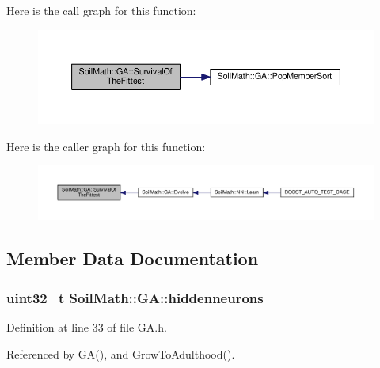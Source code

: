 Here is the call graph for this function\+:\nopagebreak
\begin{figure}[H]
\begin{center}
\leavevmode
\includegraphics[width=350pt]{class_soil_math_1_1_g_a_ac2c10631815408d044738f678c67e98b_cgraph}
\end{center}
\end{figure}




Here is the caller graph for this function\+:\nopagebreak
\begin{figure}[H]
\begin{center}
\leavevmode
\includegraphics[width=350pt]{class_soil_math_1_1_g_a_ac2c10631815408d044738f678c67e98b_icgraph}
\end{center}
\end{figure}




\subsection{Member Data Documentation}
\hypertarget{class_soil_math_1_1_g_a_a3f1eee7492f68a05b9b06ee8afb2ec20}{}
\subsubsection[{hiddenneurons}]{\setlength{\rightskip}{0pt plus 5cm}uint32\+\_\+t Soil\+Math\+::\+G\+A\+::hiddenneurons\hspace{0.3cm}{\ttfamily [private]}}\label{class_soil_math_1_1_g_a_a3f1eee7492f68a05b9b06ee8afb2ec20}


Definition at line 33 of file G\+A.\+h.



Referenced by G\+A(), and Grow\+To\+Adulthood().

